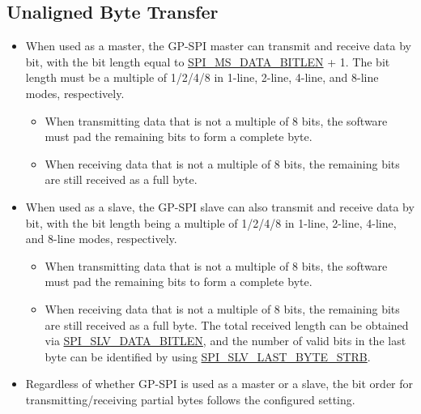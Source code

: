 \documentclass[main\_\_EN.tex]{subfiles}
\begin{document}
\subsection{Unaligned Byte Transfer}
\label{sec:unaligned-byte-transfer}

\begin{itemize}
    \item When used as a master, the GP-SPI master can transmit and receive data by bit, with the bit length equal to \hyperref[fielddesc:SPIMSDATABITLEN]{SPI\_MS\_DATA\_BITLEN} + 1. The bit length must be a multiple of 1/2/4/8 in 1-line, 2-line, 4-line, and 8-line modes, respectively. %
    \begin{itemize}
        \item When transmitting data that is not a multiple of 8 bits, the software must pad the remaining bits to form a complete byte.
        \item When receiving data that is not a multiple of 8 bits, the remaining bits are still received as a full byte.
    \end{itemize}
    \item When used as a slave, the GP-SPI slave can also transmit and receive data by bit, with the bit length being a multiple of 1/2/4/8 in 1-line, 2-line, 4-line, and 8-line modes, respectively.
    \begin{itemize}
        \item When transmitting data that is not a multiple of 8 bits, the software must pad the remaining bits to form a complete byte.
        \item When receiving data that is not a multiple of 8 bits, the remaining bits are still received as a full byte. The total received length can be obtained via \hyperref[fielddesc:SPISLVDATABITLEN]{SPI\_SLV\_DATA\_BITLEN}, and the number of valid bits in the last byte can be identified by using \hyperref[fielddesc:SPISLVLASTBYTESTRB]{SPI\_SLV\_LAST\_BYTE\_STRB}.
    \end{itemize}
\end{itemize}
\begin{tiplisting}
\vspace{-2em}
\begin{itemize}
    \item  Regardless of whether GP-SPI is used as a master or a slave, the bit order for transmitting/receiving partial bytes follows the configured setting.
\end{itemize}
\end{tiplisting}
\end{document}
